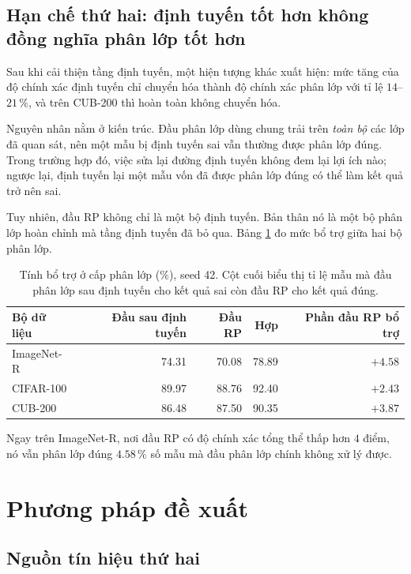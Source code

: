 \documentclass[11pt,a4paper]{article}
\begin{document}
\subsection{Hạn chế thứ hai: định tuyến tốt hơn không đồng nghĩa phân lớp tốt hơn}

Sau khi cải thiện tầng định tuyến, một hiện tượng khác xuất hiện: mức tăng của
độ chính xác định tuyến chỉ chuyển hóa thành độ chính xác phân lớp với tỉ lệ
$14$--$21\,\%$, và trên CUB-200 thì hoàn toàn không chuyển hóa.

Nguyên nhân nằm ở kiến trúc. Đầu phân lớp dùng chung trải trên \emph{toàn bộ}
các lớp đã quan sát, nên một mẫu bị định tuyến sai vẫn thường được phân lớp
đúng. Trong trường hợp đó, việc sửa lại đường định tuyến không đem lại lợi ích
nào; ngược lại, định tuyến lại một mẫu vốn đã được phân lớp đúng có thể làm kết
quả trở nên sai.

Tuy nhiên, đầu RP không chỉ là một bộ định tuyến. Bản thân nó là một bộ phân lớp
hoàn chỉnh mà tầng định tuyến đã bỏ qua. Bảng \ref{tab:cls} đo mức bổ trợ giữa
hai bộ phân lớp.

\begin{table}[htbp]
\centering
\caption{Tính bổ trợ ở cấp phân lớp (\%), seed 42. Cột cuối biểu thị tỉ lệ mẫu
mà đầu phân lớp sau định tuyến cho kết quả sai còn đầu RP cho kết quả đúng.}
\label{tab:cls}
\begin{tabular}{lrrrr}
\toprule
Bộ dữ liệu & Đầu sau định tuyến & Đầu RP & Hợp & Phần đầu RP bổ trợ \\
\midrule
ImageNet-R & 74.31 & 70.08 & 78.89 & $+4.58$ \\
CIFAR-100  & 89.97 & 88.76 & 92.40 & $+2.43$ \\
CUB-200    & 86.48 & 87.50 & 90.35 & $+3.87$ \\
\bottomrule
\end{tabular}
\end{table}

Ngay trên ImageNet-R, nơi đầu RP có độ chính xác tổng thể thấp hơn $4$ điểm, nó
vẫn phân lớp đúng $4.58\,\%$ số mẫu mà đầu phân lớp chính không xử lý được.

\section{Phương pháp đề xuất}

\subsection{Nguồn tín hiệu thứ hai}
\end{document}
